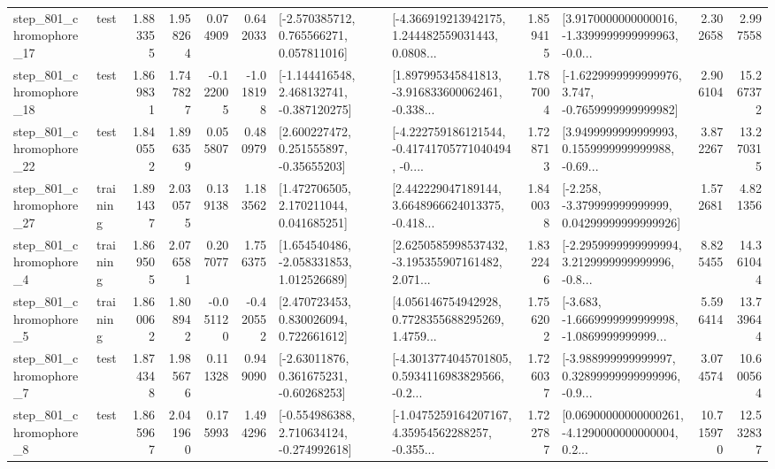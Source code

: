 \begin{tabular}{llrrrrllrlrr}
  step\_801\_chromophore\_17 &      test &      1.883355 &    1.958264 &      0.074909 &  0.642033 &    [-2.570385712, 0.765566271, 0.057811016] &  [-4.366919213942175, 1.244482559031443, 0.0808... &       1.859415 &  [3.9170000000000016, -1.3399999999999963, -0.0... &            2.302658 &          2.997558 \\
  step\_801\_chromophore\_18 &      test &      1.869831 &    1.747827 &     -0.122005 & -1.018198 &   [-1.144416548, 2.468132741, -0.387120275] &  [1.897995345841813, -3.916833600062461, -0.338... &       1.787004 &  [-1.6229999999999976, 3.747, -0.7659999999999982] &            2.906104 &         15.267372 \\
  step\_801\_chromophore\_22 &      test &      1.840552 &    1.896359 &      0.055807 &  0.480979 &     [2.600227472, 0.251555897, -0.35655203] &  [-4.222759186121544, -0.41741705771040494, -0.... &       1.728713 &  [3.9499999999999993, 0.1559999999999988, -0.69... &            3.872267 &         13.270315 \\
  step\_801\_chromophore\_27 &  training &      1.891437 &    2.030575 &      0.139138 &  1.183562 &     [1.472706505, 2.170211044, 0.041685251] &  [2.442229047189144, 3.6648966624013375, -0.418... &       1.840038 &  [-2.258, -3.379999999999999, 0.04299999999999926] &            1.572681 &          4.821356 \\
   step\_801\_chromophore\_4 &  training &      1.869505 &    2.076581 &      0.207077 &  1.756375 &    [1.654540486, -2.058331853, 1.012526689] &  [2.6250585998537432, -3.195355907161482, 2.071... &       1.832246 &  [-2.2959999999999994, 3.2129999999999996, -0.8... &            8.825455 &         14.361044 \\
   step\_801\_chromophore\_5 &  training &      1.860062 &    1.808942 &     -0.051120 & -0.420552 &     [2.470723453, 0.830026094, 0.722661612] &  [4.056146754942928, 0.7728355688295269, 1.4759... &       1.756202 &  [-3.683, -1.6669999999999998, -1.0869999999999... &            5.596414 &         13.739644 \\
   step\_801\_chromophore\_7 &      test &      1.874348 &    1.985676 &      0.111328 &  0.949090 &     [-2.63011876, 0.361675231, -0.60268253] &  [-4.3013774045701805, 0.5934116983829566, -0.2... &       1.726037 &  [-3.988999999999997, 0.32899999999999996, -0.9... &            3.074574 &         10.600564 \\
   step\_801\_chromophore\_8 &      test &      1.865967 &    2.041960 &      0.175993 &  1.494296 &   [-0.554986388, 2.710634124, -0.274992618] &  [-1.0475259164207167, 4.35954562288257, -0.355... &       1.722787 &  [0.06900000000000261, -4.1290000000000004, 0.2... &           10.715970 &         12.532837 \\

\end{tabular}
